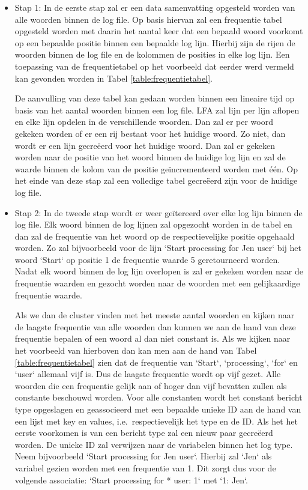 \begin{itemize}
    \item Stap 1: In de eerste stap zal er een data samenvatting opgesteld worden van alle woorden binnen de log file. Op basis hiervan zal een frequentie tabel opgesteld worden met daarin het aantal keer dat een bepaald woord voorkomt op een bepaalde positie binnen een bepaalde log lijn. Hierbij zijn de rijen de woorden binnen de log file en de kolommen de posities in elke log lijn. Een toepassing van de frequentietabel op het voorbeeld dat eerder werd vermeld kan gevonden worden in Tabel \ref{table:frequentietabel}. 
    
    De aanvulling van deze tabel kan gedaan worden binnen een lineaire tijd op basis van het aantal woorden binnen een log file. LFA zal lijn per lijn aflopen en elke lijn opdelen in de verschillende woorden. Dan zal er per woord gekeken worden of er een rij bestaat voor het huidige woord. Zo niet, dan wordt er een lijn gecreëerd voor het huidige woord. Dan zal er gekeken worden naar de positie van het woord binnen de huidige log lijn en zal de waarde binnen de kolom van de positie geïncrementeerd worden met één. Op het einde van deze stap zal een volledige tabel gecreëerd zijn voor de huidige log file.\\
    
    \item Stap 2: In de tweede stap wordt er weer geïtereerd over elke log lijn binnen de log file. Elk woord binnen de log lijnen zal opgezocht worden in de tabel en dan zal de frequentie van het woord op de respectievelijke positie opgehaald worden. Zo zal bijvoorbeeld voor de lijn `Start processing for Jen user` bij het woord `Start` op positie 1 de frequentie waarde 5 geretourneerd worden. Nadat elk woord binnen de log lijn overlopen is zal er gekeken worden naar de frequentie waarden en gezocht worden naar de woorden met een gelijkaardige frequentie waarde. 
    
    Als we dan de cluster vinden met het meeste aantal woorden en kijken naar de laagste frequentie van alle woorden dan kunnen we aan de hand van deze frequentie bepalen of een woord al dan niet constant is. Als we kijken naar het voorbeeld van hierboven dan kan men aan de hand van Tabel \ref{table:frequentietabel} zien dat de frequentie van `Start`, `processing`, `for` en `user` allemaal vijf is. Dus de laagste frequentie wordt op vijf gezet. Alle woorden die een frequentie gelijk aan of hoger dan vijf bevatten zullen als constante beschouwd worden. Voor alle constanten wordt het constant bericht type opgeslagen en geassocieerd met een bepaalde unieke ID aan de hand van een lijst met key en values, i.e.\ respectievelijk het type en de ID. Als het het eerste voorkomen is van een bericht type zal een nieuw paar gecreëerd worden. De unieke ID zal verwijzen naar de variabelen binnen het log type. Neem bijvoorbeeld `Start processing for Jen user`. Hierbij zal `Jen` als variabel gezien worden met een frequentie van 1. Dit zorgt dus voor de volgende associatie: `Start processing for * user: 1` met `1: Jen`.
\end{itemize}

